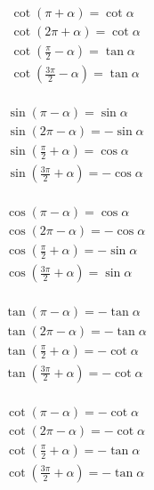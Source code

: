 \documentclass[a4paper, fleqn, fontset = mac]{ctexart}
\begin{document}
\begin{multicols}{2}
\begin{multicols}{2}[\setlength{\columnseprule}{0pt}\setlength{\columnseprule}{0pt}]
		\begin{align*}
		& \cot\left( \pi + \alpha \right) = \cot\alpha \\
		& \cot\left( 2\pi + \alpha \right) = \cot\alpha \\
		& \cot\left( \frac\pi2 - \alpha \right) = \tan\alpha \\
		& \cot\left( \frac{3\pi}2 - \alpha \right) = \tan\alpha \\
		\end{align*}
		
		\begin{align*}
		& \sin\left( \pi - \alpha \right) = \sin\alpha \\
		& \sin\left( 2\pi - \alpha \right) = -\sin\alpha \\
		& \sin\left( \frac\pi2 + \alpha \right) = \cos\alpha \\
		& \sin\left( \frac{3\pi}2 + \alpha \right) = -\cos\alpha \\
		\end{align*}
		
		\begin{align*}
		& \cos\left( \pi - \alpha \right) = \cos\alpha \\
		& \cos\left( 2\pi - \alpha \right) = -\cos\alpha \\
		& \cos\left( \frac\pi2 + \alpha \right) = -\sin\alpha \\
		& \cos\left( \frac{3\pi}2 + \alpha \right) = \sin\alpha \\
		\end{align*}
		
		\begin{align*}
		& \tan\left( \pi - \alpha \right) = -\tan\alpha \\
		& \tan\left( 2\pi - \alpha \right) = -\tan\alpha \\
		& \tan\left( \frac\pi2 + \alpha \right) = -\cot\alpha \\
		& \tan\left( \frac{3\pi}2 + \alpha \right) = -\cot\alpha \\
		\end{align*}
		
		\begin{align*}		
		& \cot\left( \pi - \alpha \right) = -\cot\alpha \\
		& \cot\left( 2\pi - \alpha \right) = -\cot\alpha \\
		& \cot\left( \frac\pi2 + \alpha \right) = -\tan\alpha \\
		& \cot\left( \frac{3\pi}2 + \alpha \right) = -\tan\alpha \\
		\end{align*}
		

\end{multicols}
\end{multicols}
\end{document}
